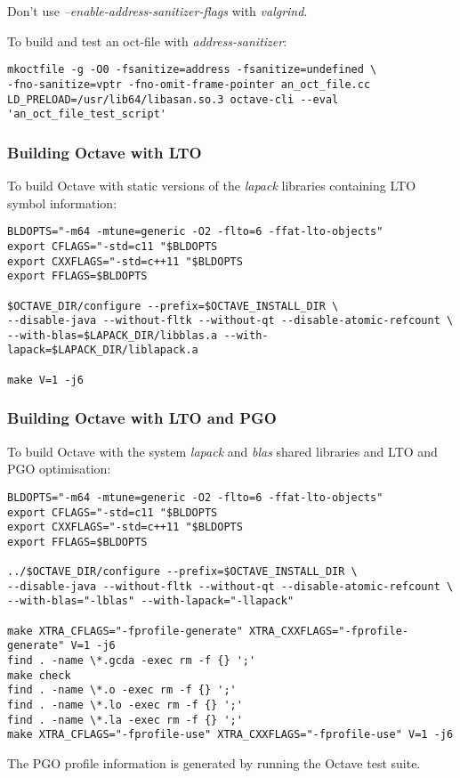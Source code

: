 \documentclass[a4paper,twoside,10pt,english]{report}
\begin{document}
Don't use \emph{--enable-address-sanitizer-flags} with \emph{valgrind}.

To build and test an oct-file with \emph{address-sanitizer}:
\begin{small}
\begin{verbatim}
mkoctfile -g -O0 -fsanitize=address -fsanitize=undefined \
-fno-sanitize=vptr -fno-omit-frame-pointer an_oct_file.cc
LD_PRELOAD=/usr/lib64/libasan.so.3 octave-cli --eval 'an_oct_file_test_script'
\end{verbatim}
\end{small}
\subsubsection*{Building Octave with LTO}
To build Octave with static versions of the \emph{lapack}
libraries containing LTO symbol information:
\begin{small}
\begin{verbatim}
BLDOPTS="-m64 -mtune=generic -O2 -flto=6 -ffat-lto-objects"
export CFLAGS="-std=c11 "$BLDOPTS
export CXXFLAGS="-std=c++11 "$BLDOPTS
export FFLAGS=$BLDOPTS

$OCTAVE_DIR/configure --prefix=$OCTAVE_INSTALL_DIR \
--disable-java --without-fltk --without-qt --disable-atomic-refcount \
--with-blas=$LAPACK_DIR/libblas.a --with-lapack=$LAPACK_DIR/liblapack.a

make V=1 -j6
\end{verbatim}
\end{small}
\subsubsection*{Building Octave with LTO and PGO}
To build Octave with the system \emph{lapack} and \emph{blas} shared libraries
and LTO and PGO optimisation:
\begin{small}
\begin{verbatim}
BLDOPTS="-m64 -mtune=generic -O2 -flto=6 -ffat-lto-objects"
export CFLAGS="-std=c11 "$BLDOPTS
export CXXFLAGS="-std=c++11 "$BLDOPTS
export FFLAGS=$BLDOPTS

../$OCTAVE_DIR/configure --prefix=$OCTAVE_INSTALL_DIR \
--disable-java --without-fltk --without-qt --disable-atomic-refcount \
--with-blas="-lblas" --with-lapack="-llapack"

make XTRA_CFLAGS="-fprofile-generate" XTRA_CXXFLAGS="-fprofile-generate" V=1 -j6 
find . -name \*.gcda -exec rm -f {} ';'
make check
find . -name \*.o -exec rm -f {} ';'
find . -name \*.lo -exec rm -f {} ';'
find . -name \*.la -exec rm -f {} ';'
make XTRA_CFLAGS="-fprofile-use" XTRA_CXXFLAGS="-fprofile-use" V=1 -j6 
\end{verbatim}
\end{small}
The PGO profile information is generated by running the Octave test suite.
\end{document}
